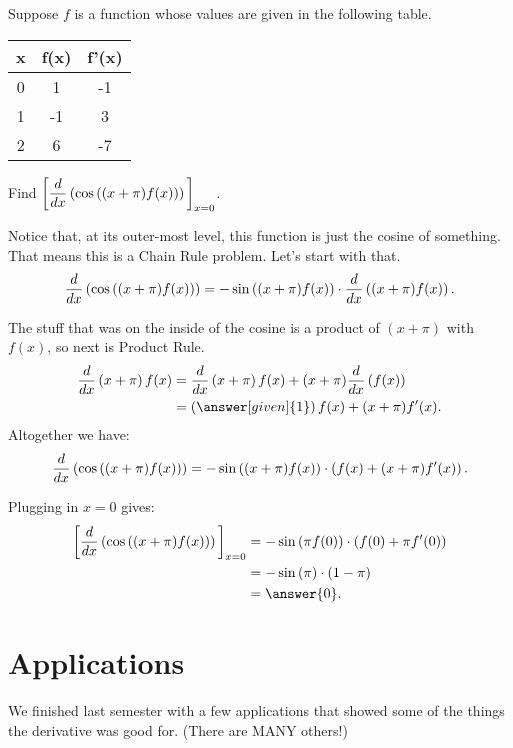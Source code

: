 \documentclass{ximera}
\begin{document}
\begin{example}
	Suppose $f$ is a function whose values are given in the following table.
	\begin{center}
		\begin{tabular}{c c c}
			\hline \hline
			x & f(x) & f'(x) \\ 
			\hline
			0 & 1 & -1 \\
			1 & -1 & 3\\
			2 & 6 & -7\\
			\hline
		\end{tabular}		
	\end{center}
	
	Find $\displaystyle \bigg[  \frac{d}{\mathop{}\!d x}\left( \cos\left( (x+\pi) f( x ) \right) \right) \bigg]_{x=0}$.
	\begin{explanation}
		Notice that, at its outer-most level, this function is just the cosine of something.  That means this is a Chain Rule problem.  Let's start with that.
		\[\frac{d}{\mathop{}\!d x}\left( \cos\left( (x+\pi) f( x ) \right) \right) = -\sin\left( (x+\pi) f( x ) \right) \cdot \frac{d}{\mathop{}\!d x}\left( (x+\pi) f( x ) \right). \]
		
		The stuff that was on the inside of the cosine is a product of $(x + \pi)$ with $f(x)$, so next is Product Rule.
		\begin{align*} 
			\ddx \left( x + \pi\right) f(x) &= \ddx\left(x+ \pi\right) f(x) + (x + \pi) \ddx \left( f(x) \right)\\
				&= \left(\answer[given]{1}\right) f(x) + (x+\pi) f'(x).
		\end{align*}
		Altogether we have:
		\[\frac{d}{\mathop{}\!d x}\left( \cos\left( (x+\pi) f( x ) \right) \right) = -\sin\left( (x+\pi) f( x ) \right) \cdot \left(f(x) + (x+\pi) f'(x) \right). \]
		
		Plugging in $x=0$ gives:
		\begin{align*}
			\eval{\ddx\left( \cos\left( (x+\pi) f( x ) \right) \right)}_{x=0} &= -\sin\left( \pi f( 0 ) \right) \cdot \left(f(0) + \pi f'(0) \right) \\
				&= -\sin\left( \pi \right) \cdot \left( 1 - \pi \right)\\
				&= \answer{0}.
		\end{align*}
	\end{explanation}
\end{example}


\section{Applications}
We finished last semester with a few applications that showed some of the things the derivative was good for.  (There are MANY others!)
\end{document}
